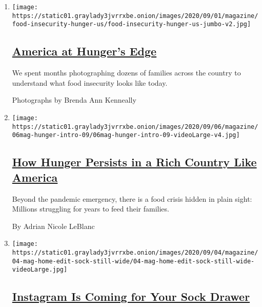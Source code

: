 \begin{enumerate}
\def\labelenumi{\arabic{enumi}.}
\item
  \texttt{[image: https://static01.graylady3jvrrxbe.onion/images/2020/09/01/magazine/food-insecurity-hunger-us/food-insecurity-hunger-us-jumbo-v2.jpg]}

  \hypertarget{america-at-hungers-edge}{%
  \subsection{\texorpdfstring{\href{/interactive/2020/09/02/magazine/food-insecurity-hunger-us.html}{America
  at Hunger's
  Edge}}{America at Hunger's Edge}}\label{america-at-hungers-edge}}

  We spent months photographing dozens of families across the country to
  understand what food insecurity looks like today.

  Photographs by Brenda Ann Kenneally
\item
  \texttt{[image: https://static01.graylady3jvrrxbe.onion/images/2020/09/06/magazine/06mag-hunger-intro-09/06mag-hunger-intro-09-videoLarge-v4.jpg]}

  \hypertarget{how-hunger-persists-in-a-rich-country-like-america}{%
  \subsection{\texorpdfstring{\href{/2020/09/02/magazine/food-security-united-states.html}{How
  Hunger Persists in a Rich Country Like
  America}}{How Hunger Persists in a Rich Country Like America}}\label{how-hunger-persists-in-a-rich-country-like-america}}

  Beyond the pandemic emergency, there is a food crisis hidden in plain
  sight: Millions struggling for years to feed their families.

  By Adrian Nicole LeBlanc
\item
  \texttt{[image: https://static01.graylady3jvrrxbe.onion/images/2020/09/04/magazine/04-mag-home-edit-sock-still-wide/04-mag-home-edit-sock-still-wide-videoLarge.jpg]}

  \hypertarget{instagram-is-coming-for-your-sock-drawer}{%
  \subsection{\texorpdfstring{\href{/2020/09/04/magazine/instagram-is-coming-for-your-sock-drawer.html}{Instagram
  Is Coming for Your Sock
  Drawer}}{Instagram Is Coming for Your Sock Drawer}}\label{instagram-is-coming-for-your-sock-drawer}}


\end{enumerate}
